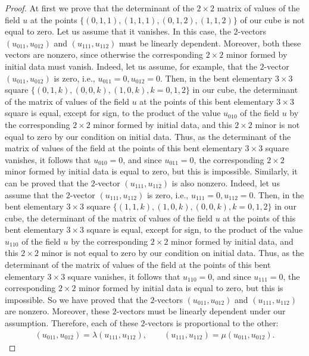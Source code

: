 \begin{proof}
At f\/irst we prove that the determinant of the $2 \times 2$ matrix of
values of the f\/ield $u$ at the points $\{(0, 1, 1), (1, 1, 1), (0,
1, 2), (1, 1, 2)\}$ of our cube is not equal to zero. Let us assume
that it vanishes. In this case, the $2$-vectors $(u_{0 1 1}, u_{0 1
2})$ and $(u_{1 1 1}, u_{1 1 2})$ must be linearly dependent.
Moreover, both these vectors are nonzero, since otherwise the
corresponding $2 \times 2$ minor formed by initial data must vanish.
Indeed, let us assume, for example, that the $2$-vector $(u_{0 1 1},
u_{0 1 2})$ is zero, i.e., $u_{0 1 1} = 0, u_{0 1 2} = 0.$ Then, in
the bent elementary $3 \times 3$ square $\{(0, 1, k), (0, 0, k), (1,
0, k), k = 0, 1, 2\}$ in our cube, the determinant of the matrix of
values of the f\/ield $u$ at the points of this bent elementary $3
\times 3$ square is equal, except for sign, to the product of the
value $u_{0 1 0}$ of the f\/ield $u$ by the corresponding $2 \times 2$
minor formed by initial data, and this $2 \times 2$ minor is not
equal to zero by our condition on initial data. Thus, as the
determinant of the matrix of values of the f\/ield at the points of
this bent elementary $3 \times 3$ square vanishes, it follows that
$u_{0 1 0} = 0$, and since $u_{0 1 1} = 0$, the corresponding $2
\times 2$ minor formed by initial data is equal to zero, but this is
impossible. Similarly, it can be proved that the $2$-vector $(u_{1 1
1}, u_{1 1 2})$ is also nonzero. Indeed, let us assume that the
$2$-vector $(u_{1 1 1}, u_{1 1 2})$ is zero, i.e., $u_{1 1 1} = 0,
u_{1 1 2} = 0.$ Then, in the bent elementary $3 \times 3$ square
$\{(1, 1, k), (1, 0, k), (0, 0, k), k = 0, 1, 2\}$ in our cube, the
determinant of the matrix of values of the f\/ield $u$ at the points
of this bent elementary $3 \times 3$ square is equal, except for
sign, to the product of the value $u_{1 1 0}$ of the f\/ield $u$ by
the corresponding $2 \times 2$ minor formed by initial data, and
this $2 \times 2$ minor is not equal to zero by our condition on
initial data. Thus, as the determinant of the matrix of values of
the f\/ield at the points of this bent elementary $3 \times 3$ square
vanishes, it follows that $u_{1 1 0} = 0$, and since $u_{1 1 1} =
0$, the corresponding $2 \times 2$ minor formed by initial data is
equal to zero, but this is impossible. So we have proved that the
$2$-vectors $(u_{0 1 1}, u_{0 1 2})$ and $(u_{1 1 1}, u_{1 1 2})$
are nonzero. Moreover, these $2$-vectors must be linearly dependent
under our assumption. Therefore, each of these $2$-vectors is
proportional to the other: \begin{gather} (u_{0 1 1}, u_{0 1 2}) = \lambda
(u_{1 1 1}, u_{1 1 2}), \qquad (u_{1 1 1}, u_{1 1 2}) = \mu (u_{0 1
1}, u_{0 1 2}). \label{6xx} \end{gather}


\end{proof}
